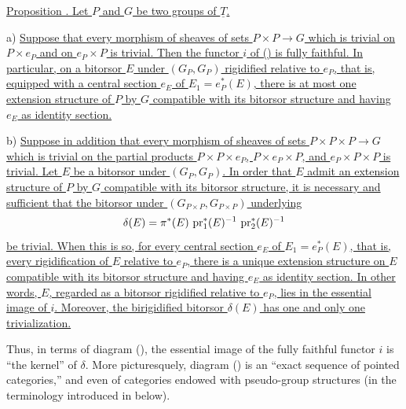 
\underline{Proposition . Let $P$ and $G$ be two groups of
$\underline T$.}

a) \underline{Suppose that every morphism of sheaves of sets
$P\times P\longrightarrow G$ which is trivial on $P\times e_P$ and on
$e_P\times P$ is trivial. Then the functor $i$ of () is fully
faithful. In particular, on a bitorsor $E$ under $(G_P,G_P)$ rigidified
relative to $e_P$, that is, equipped with a central section $e_E$ of
$E_1=e_P^*(E)$, there is at most one extension structure of $P$ by $G$
compatible with its bitorsor structure and having $e_E$ as identity
section.}

b) \underline{Suppose in addition that every morphism of sheaves of
sets $P\times P\times P\longrightarrow G$ which is trivial on the
partial products $P\times P\times e_P$, $P\times e_P\times P$, and
$e_P\times P\times P$ is trivial. Let $E$ be a bitorsor under
$(G_P,G_P)$. In order that $E$ admit an extension structure of $P$ by
$G$ compatible with its bitorsor structure, it is necessary and
sufficient that the bitorsor under
$(G_{P\times P},G_{P\times P})$ underlying}
\[
 \delta(E)=\pi^*(E)\,\operatorname{pr}_1^*(E)^{-1}\,\operatorname{pr}_2^*(E)^{-1}
\]
\underline{be trivial. When this is so, for every central section
$e_E$ of $E_1=e_P^*(E)$, that is, every rigidification of $E$ relative
to $e_P$, there is a unique extension structure on $E$ compatible with
its bitorsor structure and having $e_E$ as identity section. In other
words, $E$, regarded as a bitorsor rigidified relative to $e_P$, lies
in the essential image of $i$. Moreover, the birigidified bitorsor
$\delta(E)$ has one and only one trivialization.}


Thus, in terms of diagram (), the essential image of the fully
faithful functor $i$ is ``the kernel'' of $\delta$. More picturesquely,
diagram () is an ``exact sequence of pointed categories,'' and
even of categories endowed with pseudo-group structures (in the
terminology introduced in  below).

